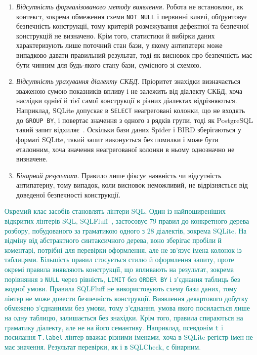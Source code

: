 \documentclass[a4paper,14pt,oneside]{extreport}
\begin{document}
\begin{enumerate}
\item \textit{Відсутність формалізованого методу виявлення.} Робота не встановлює, як контекст, зокрема обмеження схеми \texttt{NOT~NULL} і первинні ключі, обґрунтовує безпечність конструкції, тому критерій розмежування дефектної та безпечної конструкцій не визначено. Крім того, статистики й вибірки даних характеризують лише поточний стан бази, у якому антипатерн може випадково давати правильний результат, тоді як висновок про безпечність має бути чинним для будь-якого стану бази, сумісного зі схемою.
\item \textit{Відсутність урахування діалекту СКБД.} Пріоритет знахідки визначається зваженою сумою показників впливу і не залежить від діалекту СКБД, хоча наслідки однієї й тієї самої конструкції в різних діалектах відрізняються. Наприклад, SQLite допускає в \texttt{SELECT} неагреговані колонки, що не входять до \texttt{GROUP~BY}, і повертає значення з одного з рядків групи, тоді як PostgreSQL такий запит відхиляє~\cite{sqliteBareColumns,postgresGroupBy}. Оскільки бази даних Spider і BIRD зберігаються у форматі SQLite, такий запит виконується без помилки і може бути еталонним, хоча значення неагрегованої колонки в ньому однозначно не визначене.
\item \textit{Бінарний результат.} Правило лише фіксує наявність чи відсутність антипатерну, тому випадок, коли висновок неможливий, не відрізняється від доведеної безпечності конструкції.
\end{enumerate}

\textcolor{teal}{Окремий клас засобів становлять лінтери SQL. Один із найпоширеніших відкритих лінтерів SQL, SQLFluff~\cite{sqlfluff}, застосовує 79 правил до конкретного дерева розбору, побудованого за граматикою одного з 28 діалектів, зокрема SQLite. На відміну від абстрактного синтаксичного дерева, воно зберігає пробіли й коментарі, потрібні для перевірки оформлення, але не зв'язує імена колонок із таблицями. Більшість правил стосується стилю й оформлення запиту, проте окремі правила виявляють конструкції, що впливають на результат, зокрема порівняння з \texttt{NULL} через рівність, \texttt{LIMIT} без \texttt{ORDER~BY} і з'єднання таблиць без жодної умови. Правила SQLFluff не використовують схему бази даних, тому лінтер не може довести безпечність конструкції. Виявлення декартового добутку обмежено з'єднаннями без умови, тому з'єднання, умова якого посилається лише на одну таблицю, залишається без знахідки. Крім того, правила спираються на граматику діалекту, але не на його семантику. Наприклад, псевдонім \texttt{t} і посилання \texttt{T.label} лінтер вважає різними іменами, хоча в SQLite регістр імен не має значення. Результат перевірки, як і в SQLCheck, є бінарним.}
\end{document}
